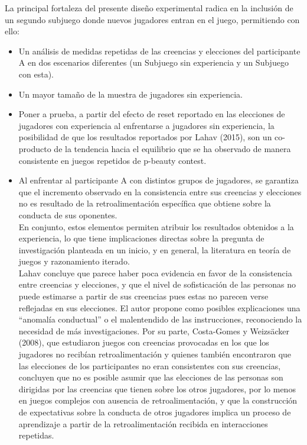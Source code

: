 La principal fortaleza del presente diseño experimental radica en la inclusión de un segundo subjuego donde nuevos jugadores entran en el juego, permitiendo con ello:\\

\begin{itemize}
\item Un análisis de medidas repetidas de las creencias y elecciones del participante A en dos escenarios diferentes (un Subjuego sin experiencia y un Subjuego con esta).\\

\item Un mayor tamaño de la muestra de jugadores sin experiencia.\\

\item Poner a prueba, a partir del efecto de reset reportado en las elecciones de jugadores con experiencia al enfrentarse a jugadores sin experiencia, la posibilidad de que los resultados reportados por Lahav (2015), son un co-producto de la tendencia hacia el equilibrio que se ha observado de manera consistente en juegos repetidos de p-beauty contest.\\

\item Al enfrentar al participante A con distintos grupos de jugadores, se garantiza que el incremento observado en la consistencia entre sus creencias y elecciones no es resultado de la retroalimentación específica que obtiene sobre la conducta de sus oponentes.\\

En conjunto, estos elementos permiten atribuir los resultados obtenidos a la experiencia, lo que tiene implicaciones directas sobre la pregunta de investigación planteada en un inicio, y en general, la literatura en teoría de juegos y razonamiento iterado.\\

Lahav \parencite*{Lahav2015} concluye que parece haber poca evidencia en favor de la consistencia entre creencias y elecciones, y que el nivel de sofisticación de las personas no puede estimarse a partir de sus creencias pues estas no parecen verse reflejadas en sus elecciones. El autor propone como posibles explicaciones una “anomalía conductual” o el malentendido de las instrucciones, reconociendo la necesidad de más investigaciones. Por su parte, Costa-Gomes y Weizsäcker (2008), que estudiaron juegos con creencias provocadas en los que los jugadores no recibían retroalimentación y quienes también encontraron que las elecciones de los participantes no eran consistentes con sus creencias, concluyen que no es posible asumir que las elecciones de las personas son dirigidas por las creencias que tienen sobre los otros jugadores, por lo menos en juegos complejos con ausencia de retroalimentación, y que la construcción de expectativas sobre la conducta de otros jugadores implica un proceso de aprendizaje a partir de la retroalimentación recibida en interacciones repetidas.\\


\end{itemize}

